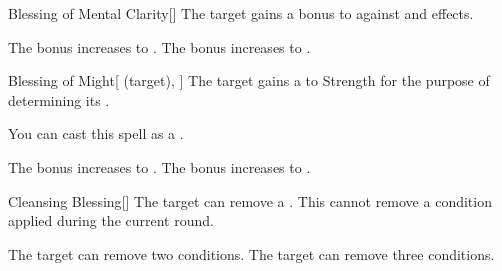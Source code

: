 \lowercase{\hypertarget{spell:Blessing of Mental Clarity}{}}\label{spell:Blessing of Mental Clarity}
\begin{freeability}[Rank 3]{\hypertarget{spell:Blessing of Mental Clarity}{Blessing of Mental Clarity}}[]
The target gains a  bonus to  against  and  effects.

\rankline
{} The bonus increases to .
 The bonus increases to .
\end{freeability}
\vspace{0.25em}



\lowercase{\hypertarget{spell:Blessing of Might}{}}\label{spell:Blessing of Might}
\begin{attuneability}[Rank 3]{\hypertarget{spell:Blessing of Might}{Blessing of Might}}[ (target), ]
The target gains a   to Strength for the purpose of determining its .

You can cast this spell as a .

\rankline
{} The bonus increases to .
 The bonus increases to .
\end{attuneability}
\vspace{0.25em}



\lowercase{\hypertarget{spell:Cleansing Blessing}{}}\label{spell:Cleansing Blessing}
\begin{freeability}[Rank 3]{\hypertarget{spell:Cleansing Blessing}{Cleansing Blessing}}[]
The target can remove a .
This cannot remove a condition applied during the current round.

\rankline
{} The target can remove two conditions.
 The target can remove three conditions.
\end{freeability}
\vspace{0.25em}



